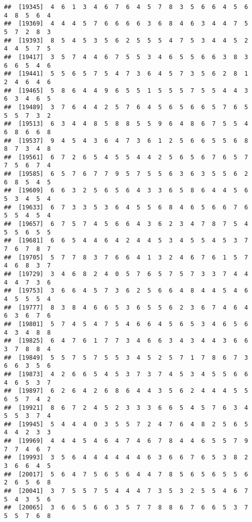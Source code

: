 \documentclass[
]{book}
\begin{document}
\begin{verbatim}
##  [19345]  4  6  1  3  4  6  7  6  4  5  7  8  3  5  6  6  4  5  6  4  8  5  6  4
##  [19369]  4  4  4  5  7  6  6  6  6  3  6  8  4  6  3  4  4  7  5  5  7  2  8  3
##  [19393]  8  5  4  5  3  5  6  2  5  5  5  4  7  5  3  4  4  5  2  4  4  5  7  5
##  [19417]  3  5  7  4  4  6  7  5  5  3  4  6  5  5  6  6  3  8  3  6  6  5  4  6
##  [19441]  5  5  6  5  7  5  4  7  3  6  4  5  7  3  5  6  2  8  1  2  4  6  4  6
##  [19465]  5  8  6  4  4  9  6  5  5  1  5  5  5  7  5  5  4  4  3  6  3  4  6  5
##  [19489]  3  7  6  4  4  2  5  7  6  4  5  6  5  6  6  5  7  6  5  5  5  7  3  2
##  [19513]  6  3  4  4  8  5  8  8  5  5  9  6  4  8  6  7  5  5  4  6  8  6  6  8
##  [19537]  9  4  5  4  3  6  4  7  3  6  1  2  5  6  6  5  5  6  8  8  7  3  4  8
##  [19561]  6  7  2  6  5  4  5  5  4  4  2  5  6  5  6  7  6  5  7  7  5  6  7  4
##  [19585]  6  5  7  6  7  7  9  5  7  5  5  6  3  6  3  5  5  6  2  6  8  5  4  5
##  [19609]  6  6  3  2  5  6  5  6  4  3  3  6  5  8  6  4  4  5  6  5  3  4  5  4
##  [19633]  6  7  3  3  5  3  6  4  5  5  6  8  4  6  5  6  6  7  6  5  5  4  5  4
##  [19657]  6  7  5  7  4  5  6  6  4  3  6  2  3  4  7  8  7  5  4  5  5  6  5  5
##  [19681]  6  6  5  4  4  6  4  2  4  4  5  3  4  5  5  4  5  3  7  7  6  7  8  7
##  [19705]  5  7  7  8  3  7  6  6  4  1  3  2  4  6  7  6  1  5  7  4  6  8  3  7
##  [19729]  3  4  6  8  2  4  0  5  7  6  5  7  5  7  3  3  7  4  4  4  4  7  3  6
##  [19753]  3  6  6  4  5  7  3  6  2  5  6  6  4  8  4  4  5  4  6  4  5  5  5  4
##  [19777]  8  3  8  4  6  6  5  3  6  5  5  6  2  3  6  7  4  6  4  6  3  6  7  6
##  [19801]  5  7  4  5  4  7  5  4  6  6  4  5  6  5  3  4  6  5  6  4  3  4  8  8
##  [19825]  6  4  7  6  1  7  7  3  4  6  6  3  4  3  4  4  3  6  6  3  7  8  8  4
##  [19849]  5  5  7  5  7  5  5  3  4  5  2  5  7  1  7  8  6  7  3  6  6  3  5  6
##  [19873]  4  2  6  6  5  4  5  3  7  3  7  4  5  3  4  5  5  6  6  4  6  5  3  7
##  [19897]  6  2  6  4  2  6  8  6  4  4  3  5  6  2  4  4  4  5  5  6  5  7  4  2
##  [19921]  8  6  7  2  4  5  2  3  3  3  6  6  5  4  5  7  6  3  4  5  5  3  7  4
##  [19945]  5  4  4  4  0  3  5  5  7  2  4  7  6  4  8  2  5  6  5  4  4  2  3  3
##  [19969]  4  4  4  5  4  6  4  7  4  6  7  8  4  4  6  5  5  7  9  7  7  4  6  7
##  [19993]  3  5  6  4  4  4  4  4  4  6  3  6  6  7  6  5  3  8  2  3  6  6  4  5
##  [20017]  5  6  4  7  5  6  5  6  4  4  7  8  5  6  5  6  5  5  6  2  6  5  6  8
##  [20041]  3  7  5  5  7  5  4  4  4  7  3  5  3  2  5  5  4  6  7  5  4  3  5  6
##  [20065]  3  6  6  5  6  6  3  5  7  7  8  8  6  7  6  6  5  3  7  5  5  7  6  8

\end{verbatim}
\end{document}
